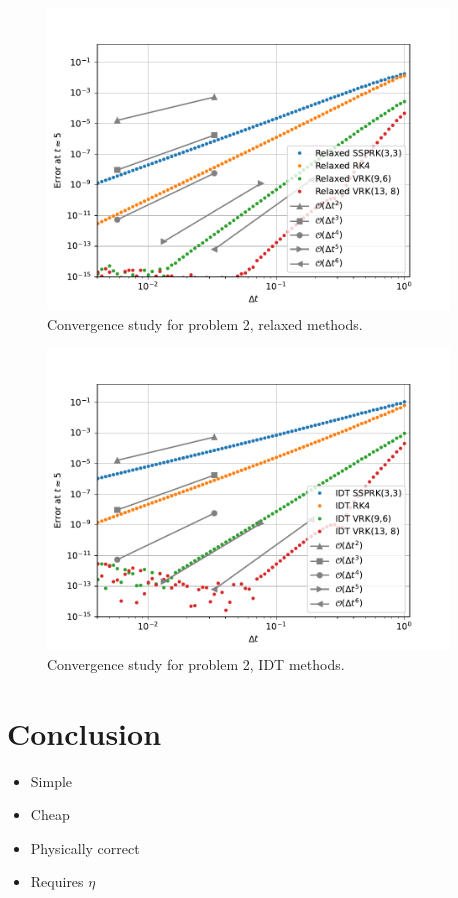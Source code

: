 \documentclass{report}
\begin{document}
    \begin{figure}[H]
        \centering
        \includegraphics[width=0.95\textwidth]{figs/P2_Relaxed_RK4.pdf}
        \caption{Convergence study for problem 2, relaxed methods.}
        \label{Fig4b}
    \end{figure}

    \begin{figure}[H]
        \centering
        \includegraphics[width=0.95\textwidth]{figs/P2_IDT_RK4.pdf}
        \caption{Convergence study for problem 2, IDT methods.}
        \label{Fig4c}
    \end{figure}


\chapter{Conclusion}
    \begin{itemize}
        \item Simple
        \item Cheap
        \item Physically correct
        \item Requires \(\eta\)
    \end{itemize}
\end{document}

